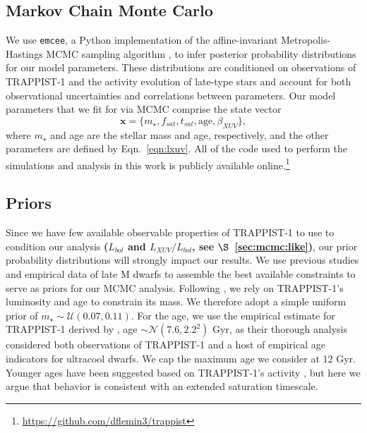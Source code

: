 \documentclass[twocolumn]{aastex62}
\def\gsim{~\rlap{$>$}{\lower 1.0ex\hbox{$\sim$}}}
\newcommand{\xxx}[1]{{\textbf{#1}}}
\begin{document}
\subsection{Markov Chain Monte Carlo} \label{sec:mcmc}

We use \texttt{emcee}, a Python implementation of the affine-invariant Metropolis-Hastings MCMC sampling algorithm \citep{ForemanMackey2013}, to infer posterior probability distributions for our model parameters. These distributions are conditioned on observations of TRAPPIST-1 and the activity evolution of late-type stars and account for both observational uncertainties and correlations between parameters. Our model parameters that we fit for via MCMC comprise the state vector
\begin{equation} \label{eqn:state}
    \textbf{x} = \{m_{\star}, f_{sat}, t_{sat}, \mathrm{age}, \beta_{XUV}\},
\end{equation}
where $m_{\star}$ and age are the stellar mass and age, respectively, and the other parameters are defined by Eqn.~\ref{eqn:lxuv}. All of the code used to perform the simulations and analysis in this work is publicly available online.\footnote{ \href{https://github.com/dflemin3/trappist}{https://github.com/dflemin3/trappist}}

\subsection{Priors} \label{sec:mcmc:priors}

Since we have few available observable properties of TRAPPIST-1 to use to condition our analysis \xxx{($L_{bol}$ and $L_{XUV}/L_{bol}$, see $\S$~\ref{sec:mcmc:like})}, our prior probability distributions will strongly impact our results. We use previous studies and empirical data of late M dwarfs to assemble the best available constraints to serve as priors for our MCMC analysis. Following \citet{vanGrootel2018}, we rely on TRAPPIST-1's luminosity and age to constrain its mass. We therefore adopt a simple uniform prior of $m_{\star} \sim \mathcal{U}(0.07, 0.11)$. For the age, we use the empirical estimate for TRAPPIST-1 derived by \citet{Burgasser2017}, age $\sim \mathcal{N}(7.6, 2.2^2)$ Gyr, as their thorough analysis considered both observations of TRAPPIST-1 and a host of empirical age indicators for ultracool dwarfs. We cap the maximum age we consider at 12 Gyr. Younger ages have been suggested based on TRAPPIST-1's activity \citep[e.g.~$\gsim 500$ Myr,][]{Bourrier2017b}, but here we argue that behavior is consistent with an extended saturation timescale.
\end{document}
